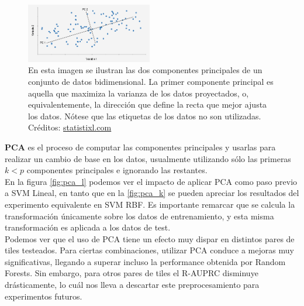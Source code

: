 \begin{figure}[h!]
\centering
  \includegraphics[width=0.49\textwidth]{Kap5/pca.png}
\caption{En esta imagen se ilustran las dos componentes principales de un conjunto de datos bidimensional. La primer componente principal es aquella que maximiza la varianza de los datos proyectados, o, equivalentemente, la dirección que define la recta que mejor ajusta los datos. Nótese que las etiquetas de los datos no son utilizadas. Créditos: \url{statistixl.com}}
\label{fig:pca}
\end{figure}

\textbf{PCA} es el proceso de computar las componentes principales y usarlas para realizar un cambio de base en los datos, usualmente utilizando sólo las primeras $k<p$ componentes principales e ignorando las restantes. \\

En la figura \ref{fig:pca_l} podemos ver el impacto de aplicar PCA como paso previo a SVM Lineal, en tanto que en la \ref{fig:pca_k} se pueden apreciar los resultados del experimento equivalente en SVM RBF. Es importante remarcar que se calcula la transformación únicamente sobre los datos de entrenamiento, y esta misma transformación es aplicada a los datos de test.\\

Podemos ver que el uso de PCA tiene un efecto muy dispar en distintos pares de tiles testeados. Para ciertas combinaciones, utilizar PCA conduce a mejoras muy significativas, llegando a superar incluso la performance obtenida por Random Forests. Sin embargo, para otros pares de tiles el R-AUPRC disminuye drásticamente, lo cuál nos lleva a descartar este preprocesamiento para experimentos futuros.


